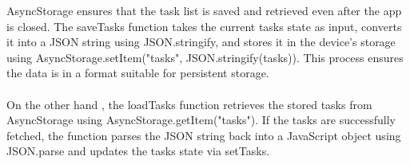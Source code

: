 \documentclass{article}
\begin{document}
\begin{enumerate}
\begin{itemize}
                   AsyncStorage ensures that the task list is saved and retrieved even after the app is closed. The saveTasks function takes the current tasks state as input, converts it into a JSON string using JSON.stringify, and stores it in the device's storage using AsyncStorage.setItem("tasks", JSON.stringify(tasks)). This process ensures the data is in a format suitable for persistent storage. \\
        \\
        On the other hand , the loadTasks function retrieves the stored tasks from AsyncStorage using AsyncStorage.getItem("tasks"). If the tasks are successfully fetched, the function parses the JSON string back into a JavaScript object using JSON.parse and updates the tasks state via setTasks. \\
                    

\end{itemize}
\end{enumerate}
\end{document}
